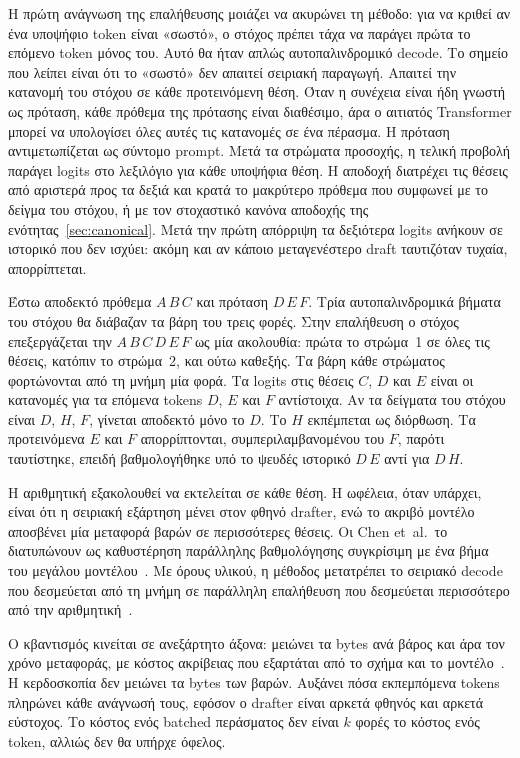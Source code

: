 \documentclass[a4paper,12pt]{report}
\theoremstyle{plain}
\theoremstyle{definition}
\theoremstyle{remark}
\begin{document}
Η πρώτη ανάγνωση της επαλήθευσης μοιάζει να ακυρώνει τη μέθοδο: για να κριθεί
αν ένα υποψήφιο token είναι «σωστό», ο στόχος πρέπει τάχα να παράγει πρώτα
το επόμενο token μόνος του. Αυτό θα ήταν απλώς αυτοπαλινδρομικό decode. Το
σημείο που λείπει είναι ότι το «σωστό» δεν απαιτεί σειριακή παραγωγή. Απαιτεί
την κατανομή του στόχου σε κάθε προτεινόμενη θέση. Όταν η συνέχεια είναι ήδη
γνωστή ως πρόταση, κάθε πρόθεμα της πρότασης είναι διαθέσιμο, άρα ο αιτιατός
Transformer μπορεί να υπολογίσει όλες αυτές τις κατανομές σε ένα πέρασμα.
Η πρόταση αντιμετωπίζεται ως σύντομο prompt. Μετά τα στρώματα προσοχής, η
τελική προβολή παράγει logits στο λεξιλόγιο για κάθε υποψήφια θέση. Η
αποδοχή διατρέχει τις θέσεις από αριστερά προς τα δεξιά και κρατά το μακρύτερο
πρόθεμα που συμφωνεί με το δείγμα του στόχου, ή με τον στοχαστικό κανόνα
αποδοχής της ενότητας~\ref{sec:canonical}. Μετά την πρώτη απόρριψη τα
δεξιότερα logits ανήκουν
σε ιστορικό που δεν ισχύει: ακόμη και αν κάποιο μεταγενέστερο draft ταυτιζόταν
τυχαία, απορρίπτεται.

Έστω αποδεκτό πρόθεμα \(A\,B\,C\) και πρόταση \(D\,E\,F\). Τρία αυτοπαλινδρομικά
βήματα του στόχου θα διάβαζαν τα βάρη του τρεις φορές. Στην επαλήθευση ο στόχος
επεξεργάζεται την \(A\,B\,C\,D\,E\,F\) ως μία ακολουθία: πρώτα το στρώμα~1 σε
όλες τις θέσεις, κατόπιν το στρώμα~2, και ούτω καθεξής. Τα βάρη κάθε στρώματος
φορτώνονται από τη μνήμη μία φορά. Τα logits στις θέσεις \(C\), \(D\) και \(E\)
είναι οι κατανομές για τα επόμενα tokens \(D\), \(E\) και \(F\) αντίστοιχα.
Αν τα δείγματα του στόχου είναι \(D\), \(H\), \(F\), γίνεται αποδεκτό μόνο το
\(D\). Το \(H\) εκπέμπεται ως διόρθωση. Τα προτεινόμενα \(E\) και \(F\)
απορρίπτονται, συμπεριλαμβανομένου του \(F\), παρότι ταυτίστηκε, επειδή
βαθμολογήθηκε υπό το ψευδές ιστορικό \(D\,E\) αντί για \(D\,H\).

Η αριθμητική εξακολουθεί να εκτελείται σε κάθε θέση. Η ωφέλεια, όταν υπάρχει,
είναι ότι η σειριακή εξάρτηση μένει στον φθηνό drafter, ενώ το ακριβό μοντέλο
αποσβένει μία μεταφορά βαρών σε περισσότερες θέσεις. Οι Chen et~al.\ το
διατυπώνουν ως καθυστέρηση παράλληλης βαθμολόγησης συγκρίσιμη με ένα βήμα του
μεγάλου μοντέλου~\cite{chen2023accelerating}. Με όρους υλικού, η μέθοδος
μετατρέπει το σειριακό decode που δεσμεύεται από τη μνήμη σε παράλληλη
επαλήθευση που δεσμεύεται περισσότερο από την
αριθμητική~\cite{vllm-speculators-docs}.

Ο κβαντισμός κινείται σε ανεξάρτητο άξονα: μειώνει τα bytes ανά βάρος και άρα
τον χρόνο μεταφοράς, με κόστος ακρίβειας που εξαρτάται από το σχήμα και το
μοντέλο~\cite{frantar2023gptq,lin2024awq}. Η κερδοσκοπία δεν μειώνει τα bytes
των βαρών. Αυξάνει πόσα εκπεμπόμενα tokens πληρώνει κάθε ανάγνωσή τους, εφόσον
ο drafter είναι αρκετά φθηνός και αρκετά εύστοχος. Το κόστος ενός batched
περάσματος δεν είναι \(k\) φορές το κόστος ενός token, αλλιώς δεν θα υπήρχε
όφελος.
\end{document}
